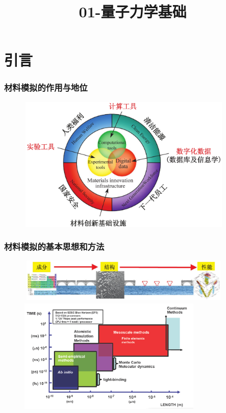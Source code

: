 \small
\title{01-量子力学基础}
\section{引言}
\frame
{
	\frametitle{材料模拟的作用与地位}
\begin{figure}[h!]
\vspace*{-0.18in}
\centering
\includegraphics[height=2.55in,width=4.05in]{Figures/MGE.png}
\label{MGE}
\end{figure}
}

\frame
{
	\frametitle{材料模拟的基本思想和方法}
\begin{figure}[h!]
\vspace*{-0.25in}
\centering
\includegraphics[height=0.80in,width=4.05in]{Figures/MGE-2.png}
\vskip 0.05pt
\includegraphics[height=2.20in,width=3.45in]{Figures/Multi-Scale-6.png}
\label{Multi-Scale}
\end{figure}
}

